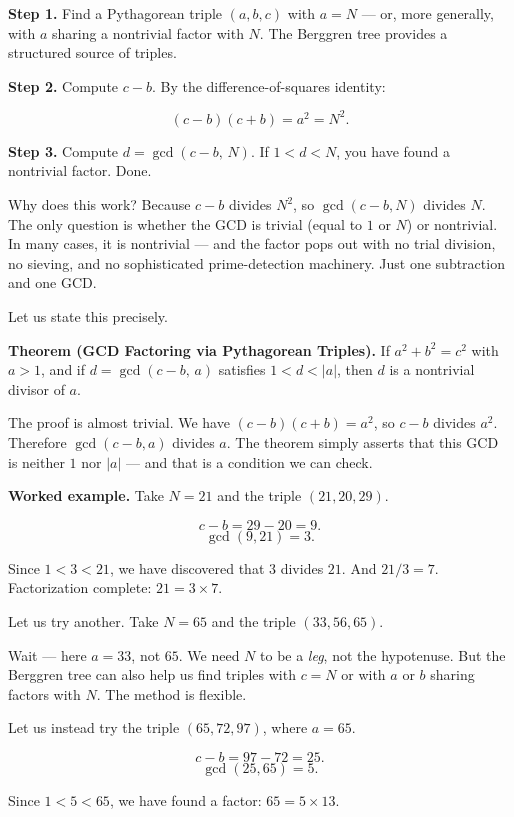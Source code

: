 \textbf{Step 1.} Find a Pythagorean triple \((a, b, c)\) with \(a = N\) --- or, more generally, with \(a\) sharing a nontrivial factor with \(N\). The Berggren tree provides a structured source of triples.

\textbf{Step 2.} Compute \(c - b\). By the difference-of-squares identity:

\[(c - b)(c + b) = a^2 = N^2.\]

\textbf{Step 3.} Compute \(d = \gcd(c - b, \, N)\). If \(1 < d < N\), you have found a nontrivial factor. Done.

Why does this work? Because \(c - b\) divides \(N^2\), so \(\gcd(c - b, N)\) divides \(N\). The only question is whether the GCD is trivial (equal to \(1\) or \(N\)) or nontrivial. In many cases, it is nontrivial --- and the factor pops out with no trial division, no sieving, and no sophisticated prime-detection machinery. Just one subtraction and one GCD.

Let us state this precisely.

\textbf{Theorem (GCD Factoring via Pythagorean Triples).} If \(a^2 + b^2 = c^2\) with \(a > 1\), and if \(d = \gcd(c - b, \, a)\) satisfies \(1 < d < |a|\), then \(d\) is a nontrivial divisor of \(a\).

The proof is almost trivial. We have \((c - b)(c + b) = a^2\), so \(c - b\) divides \(a^2\). Therefore \(\gcd(c - b, a)\) divides \(a\). The theorem simply asserts that this GCD is neither \(1\) nor \(|a|\) --- and that is a condition we can check.

\textbf{Worked example.} Take \(N = 21\) and the triple \((21, 20, 29)\).

\[c - b = 29 - 20 = 9.\] \[\gcd(9, 21) = 3.\]

Since \(1 < 3 < 21\), we have discovered that \(3\) divides \(21\). And \(21 / 3 = 7\). Factorization complete: \(21 = 3 \times 7\).

Let us try another. Take \(N = 65\) and the triple \((33, 56, 65)\).

Wait --- here \(a = 33\), not \(65\). We need \(N\) to be a \emph{leg}, not the hypotenuse. But the Berggren tree can also help us find triples with \(c = N\) or with \(a\) or \(b\) sharing factors with \(N\). The method is flexible.

Let us instead try the triple \((65, 72, 97)\), where \(a = 65\).

\[c - b = 97 - 72 = 25.\] \[\gcd(25, 65) = 5.\]

Since \(1 < 5 < 65\), we have found a factor: \(65 = 5 \times 13\).

